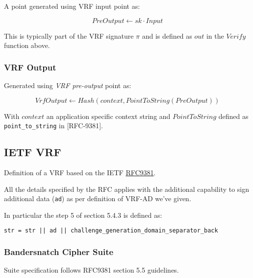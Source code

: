 \documentclass[
]{article}
\begin{document}
A point generated using VRF input point as:

\[PreOutput \leftarrow sk \cdot Input\]

This is typically part of the VRF signature \(\pi\) and is defined as
\(out\) in the \(Verify\) function above.

\hypertarget{vrf-output}{%
\subsubsection{VRF Output}\label{vrf-output}}

Generated using \emph{VRF pre-output} point as:

\[VrfOutput \leftarrow Hash(context, PointToString(PreOutput))\]

With \(context\) an application specific context string and
\(PointToString\) defined as \texttt{point\_to\_string} in
{[}RFC-9381{]}.

\hypertarget{ietf-vrf}{%
\subsection{IETF VRF}\label{ietf-vrf}}

Definition of a VRF based on the IETF
\href{https://datatracker.ietf.org/doc/rfc9381/}{RFC9381}.

All the details specified by the RFC applies with the additional
capability to sign additional data (\texttt{ad}) as per definition of
VRF-AD we've given.

In particular the step 5 of section 5.4.3 is defined as:

\begin{verbatim}
str = str || ad || challenge_generation_domain_separator_back
\end{verbatim}

\hypertarget{bandersnatch-cipher-suite}{%
\subsubsection{Bandersnatch Cipher
Suite}\label{bandersnatch-cipher-suite}}

Suite specification follows RFC9381 section 5.5 guidelines.
\end{document}
